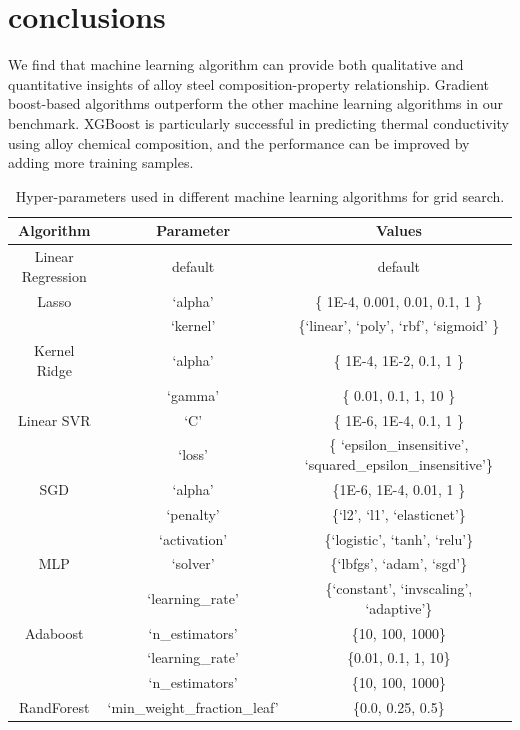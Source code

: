 \documentclass[10pt,aps,prb,amsmath,amssymb,twocolumn,letterpaper,nobalancelastpage,final,citeautoscript,floatfix,raggedbottom,superscriptaddress]{revtex4-1}
\begin{document}
\section{conclusions}
We find that machine learning algorithm can provide both qualitative and quantitative insights of alloy steel composition-property relationship. Gradient boost-based algorithms outperform the other machine learning algorithms in our benchmark. XGBoost is particularly successful in predicting thermal conductivity using alloy chemical composition, and the performance can be improved by adding more training samples.

\begin{table}[t]
\begin{ruledtabular}
\caption{Hyper-parameters used in different machine learning algorithms for grid search.\label{tab:hyperparam}}
\centering
\begin{tabular}{ccc}
\sffamily Algorithm & \sffamily Parameter & \sffamily Values \\
\hline
Linear Regression & default & default \\
\hline
Lasso & `alpha' & \{ 1E-4, 0.001, 0.01, 0.1, 1 \}\\
\hline
& `kernel' & \{`linear', `poly', `rbf', `sigmoid' \} \\
Kernel Ridge & `alpha' & \{ 1E-4, 1E-2, 0.1, 1 \} \\
& `gamma' & \{ 0.01, 0.1, 1, 10 \} \\
\hline
Linear SVR & `C' & \{ 1E-6, 1E-4, 0.1, 1 \} \\
& `loss' & \{ `epsilon\_insensitive', `squared\_epsilon\_insensitive'\} \\
\hline
SGD & `alpha' & \{1E-6, 1E-4, 0.01, 1 \} \\
& `penalty' & \{`l2', `l1', `elasticnet'\} \\
\hline
& `activation' & \{`logistic', `tanh', `relu'\} \\
MLP & `solver' & \{`lbfgs', `adam', `sgd'\} \\
& `learning\_rate' & \{`constant', `invscaling', `adaptive'\} \\
\hline
Adaboost & `n\_estimators' & \{10, 100, 1000\} \\
& `learning\_rate' & \{0.01, 0.1, 1, 10\} \\
\hline
& `n\_estimators' & \{10, 100, 1000\} \\
RandForest& `min\_weight\_fraction\_leaf' & \{0.0, 0.25, 0.5\} \\

\end{tabular}
\end{ruledtabular}
\end{table}
\end{document}
